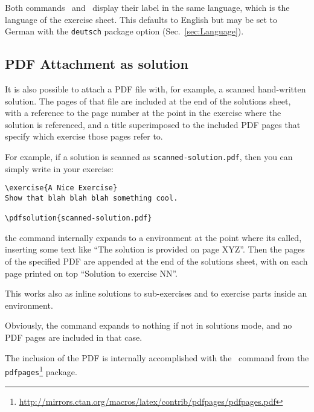 \documentclass[11pt,a4paper]{article}
\begin{document}

\begin{pkgnotice}
  Both commands~ and~ display their label in the same
  language, which is the language of the exercise sheet. This defaults to English but may
  be set to German with the {\tt deutsch} package option (Sec.~\ref{sec:Language}).
\end{pkgnotice}


\subsection{PDF Attachment as solution}

It is also possible to attach a PDF file with, for example, a scanned hand-written
solution. The pages of that file are included at the end of the solutions sheet, with a
reference to the page number at the point in the exercise where the solution is
referenced, and a title superimposed to the included PDF pages that specify which exercise
those pages refer to.

For example, if a solution is scanned as \texttt{scanned-solution.pdf}, then you can
simply write in your exercise:
\begin{pkgverbatim}
\begin{verbatim}
\exercise{A Nice Exercise}
Show that blah blah blah something cool.

\pdfsolution{scanned-solution.pdf}

\end{verbatim}
\end{pkgverbatim}

the  command internally expands to a  environment
at the point where its called, inserting some text like ``The solution is provided on page
XYZ''. Then the pages of the specified PDF are appended at the end of the solutions sheet,
with on each page printed on top ``Solution to exercise NN''.

This works also as inline solutions to sub-exercises and to exercise parts inside an\\
 environment.

Obviously, the command expands to nothing if not in solutions mode, and no PDF pages are
included in that case.

The inclusion of the PDF is internally accomplished with the~ command
from the
\texttt{pdfpages}\footnote{\url{http://mirrors.ctan.org/macros/latex/contrib/pdfpages/pdfpages.pdf}}
package.
\end{document}
